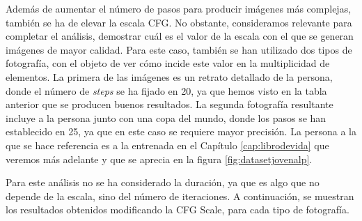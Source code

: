 Además de aumentar el número de pasos para producir imágenes más complejas, también se ha de elevar la escala CFG. No obstante, consideramos relevante para completar el análisis, demostrar cuál es el valor de la escala con el que se generan imágenes de mayor calidad. Para este caso, también se han utilizado dos tipos de fotografía, con el objeto de ver cómo incide este valor en la multiplicidad de elementos. La primera de las imágenes es un retrato detallado de la persona, donde el número de \textit{steps} se ha fijado en 20, ya que hemos visto en la tabla anterior que se producen buenos resultados. La segunda fotografía resultante incluye a la persona junto con una copa del mundo, donde los pasos se han establecido en 25, ya que en este caso se requiere mayor precisión. La persona a la que se hace referencia es a la entrenada en el Capítulo \ref{cap:librodevida} que veremos más adelante y que se aprecia en la figura \ref*{fig:datasetjovenalp}.

Para este análisis no se ha considerado la duración, ya que es algo que no depende de la escala, sino del número de iteraciones. A continuación, se muestran los resultados obtenidos modificando la CFG Scale, para cada tipo de fotografía.

